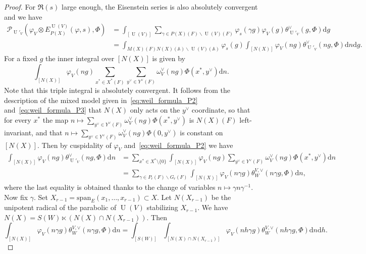 \documentclass[letterpaper,11pt]{amsart}
\newcommand{\bA}{\mathbb{A}}
\newcommand{\cP}{\mathcal{P}}
\newcommand{\rd}{\mathrm{d}}
\newcommand{\<}{\negthickspace}
\DeclareMathOperator{\U}{U}
\theoremstyle{definition}
\theoremstyle{plain}
\theoremstyle{remark}
\numberwithin{equation}{section}
\begin{document}
\begin{proof}
For $\Re(s)$ large enough, the Eisenstein series is also absolutely convergent and we have
\begin{align}
\label{eq:global_period}
     \cP_{\U'_V}\left(\varphi_V \otimes E_{P(X)}^{\U(V)}(\varphi,s) , \Phi \right)
    &=\int_{[\U(V)]}\sum_{ \gamma \in P(X)(F) \backslash \U(V)(F)} \varphi_s( \gamma g) \varphi_V(g) \theta_{\U'_V}^\vee(g,\Phi) \rd g \nonumber \\
    &=\int_{M(X)(F)N(X)(\bA) \backslash \U(V)(\bA)} \varphi_s(g)  \int_{[N(X)]}\varphi_V(ng) \theta_{\U'_V}^\vee(ng,\Phi) \rd n \rd g.
\end{align}
For a fixed $g$ the inner integral over $[N(X)]$ is given by
\begin{equation*}
    \int_{[N(X)]}\varphi_V(ng) \sum_{x^* \in X^*(F)} \sum_{y^\vee \in Y^\vee(F)}\omega^\vee_V(ng) \Phi(x^*,y^\vee) \rd n.
\end{equation*}
Note that this triple integral is absolutely convergent. It follows from the description of the mixed model given in~\eqref{eq:weil_formula_P2} and~\eqref{eq:weil_formula_P3} that $N(X)$ only acts on the $y^\vee$ coordinate, so that for every $x^*$ the map $n \mapsto  \sum_{y^\vee \in Y^\vee(F)}\omega^\vee_V(ng) \Phi(x^*,y^\vee)$ is $N(X)(F)$ left-invariant, and that $n \mapsto  \sum_{y^\vee \in Y^\vee(F)}\omega^\vee_V(ng) \Phi(0,y^\vee)$ is constant on $[N(X)]$. Then by cuspidality of $\varphi_V$ and~\eqref{eq:weil_formula_P2} we have
\begin{align*}
    \int_{[N(X)]}\varphi_V(ng) \theta_{\U'_V}^\vee(ng,\Phi) \rd n&
    =\sum_{x^* \in X^* \setminus \{0\}} \int_{[N(X)]}\varphi_V(ng) \sum_{y^\vee \in Y^\vee(F)}\omega^\vee_V(ng) \Phi(x^*,y^\vee) \rd n \\
    &=\sum_{\gamma \in P_r(F) \backslash G_r(F)} \int_{[N(X)]}\varphi_V(n\gamma g) \theta_W^{V,\vee}(n \gamma g, \Phi) \rd n,
\end{align*}
where the last equality is obtained thanks to the change of variables $n \mapsto \gamma n \gamma^{-1}$. Now fix $\gamma$. Set $X_{r-1}=\mathrm{span}_E(x_1,\hdots,x_{r-1}) \subset X$. Let $N(X_{r-1})$ be the unipotent radical of the parabolic of $\U(V)$ stabilizing $X_{r-1}$. We have $N(X)=S(W) \ltimes (N(X) \cap N(X_{r-1}))$. Then
\begin{equation}
\label{eq:global_Fourier}
    \int_{[N(X)]}\varphi_V(n\gamma g) \theta_W^{V,\vee}(n \gamma g, \Phi) \rd n  
    =\int_{[S(W)]}\int_{[N(X) \cap N(X_{r-1})]} \varphi_V(nh \gamma g)
    \theta_W^{V,\vee}(n h\gamma g, \Phi) \rd n \rd h. 

\end{equation}
\end{proof}
\end{document}
